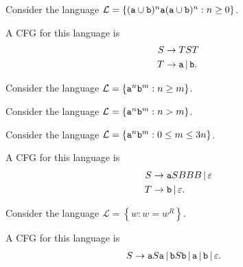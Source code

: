 \documentclass{notes}
\begin{document}
\begin{eg}
  Consider the language $\mathcal L = \left \{ (\verb~a~ \cup \verb~b~)^n \verb~a~ (\verb~a~ \cup \verb~b~)^n : n \geq 0 \right \}$.
  
  A CFG for this language is 
  \begin{align*}
    S &\to T S T \\ 
    T &\to \verb~a~ \, | \, \verb~b~.
  \end{align*}
\end{eg}

\begin{eg}
  Consider the language $\mathcal L = \left \{ \verb~a~^n \verb~b~^m : n \geq m \right \}$.
\end{eg}

\begin{eg}
  Consider the language $\mathcal L = \left \{ \verb~a~^n \verb~b~^m : n > m \right \}$.
\end{eg}

\begin{eg}
  Consider the language $\mathcal L = \left \{ \verb~a~^n \verb~b~^m : 0 \leq m \leq 3 n \right \}$.

  A CFG for this language is 
  \begin{align*}
    S &\to \verb~a~ S B B B \, | \, \varepsilon \\ 
    T &\to \verb~b~ \, | \, \varepsilon.
  \end{align*}
\end{eg}

\begin{eg}
  Consider the language $\mathcal L = \left \{ w : w = w^R \right \}$.
  
  A CFG for this language is 
  \begin{align*}
    S &\to \verb~a~ S \verb~a~ \, | \, \verb~b~ S \verb~b~ \, | \, \verb~a~ \, | \, \verb~b~ \, | \, \varepsilon.
  \end{align*}
\end{eg}
\end{document}
